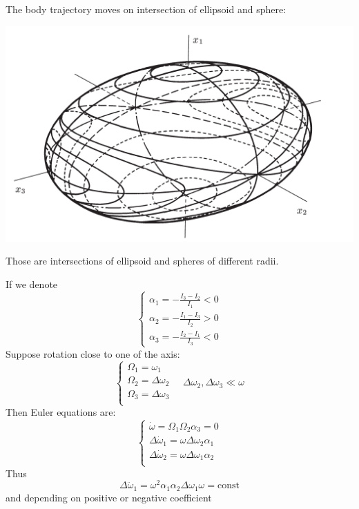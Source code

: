The body trajectory moves on intersection of ellipsoid and sphere:
\begin{center}
	\includegraphics[width=\linewidth]{./lect23/1.png}
\end{center}
Those are intersections of ellipsoid and spheres of different radii.

If we denote 
$$\begin{cases}
\alpha_1 = -\frac{I_3-I_2}{I_1} < 0\\
\alpha_2 = -\frac{I_1-I_3}{I_2} > 0\\
\alpha_3 = -\frac{I_2-I_1}{I_3} < 0
\end{cases}$$
Suppose rotation close to one of the axis:
$$\begin{cases}
\Omega_1 = \omega_1\\
\Omega_2 = \Delta\omega_2\\
\Omega_3 =  \Delta\omega_3\\
\end{cases} \quad \Delta \omega_2, \Delta \omega_3 \ll \omega$$
Then Euler equations are:
$$\begin{cases}
\dot{\omega} = \Omega_1\Omega_2\alpha_3 = 0\\
\Delta \dot{\omega}_1 =\omega \Delta \omega_2 \alpha_1\\
\Delta \dot{\omega}_2  =\omega \Delta \omega_1 \alpha_2\\
\end{cases}$$
Thus
$$\Delta \ddot{\omega}_1 = \omega^2 \alpha_1 \alpha_2 \Delta \omega_1 \omega = \text{const}$$
and depending on positive or negative coefficient 
